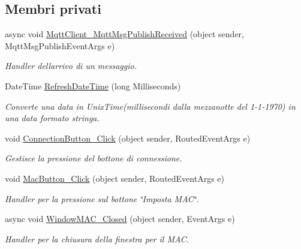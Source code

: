 \subsection*{Membri privati}
\begin{DoxyCompactItemize}
\item 
\mbox{\label{classclient__app_1_1_main_window_a6e80a62bc23dfd09f691d94461abc62f}} 
async void \mbox{\hyperlink{classclient__app_1_1_main_window_a6e80a62bc23dfd09f691d94461abc62f}{Mqtt\+Client\+\_\+\+Mqtt\+Msg\+Publish\+Received}} (object sender, Mqtt\+Msg\+Publish\+Event\+Args e)
\begin{DoxyCompactList}\small\item\em Handler dell\textquotesingle{}arrivo di un messaggio. \end{DoxyCompactList}\item 
Date\+Time \mbox{\hyperlink{classclient__app_1_1_main_window_aed5a74551edec2ad387d85b8b883597d}{Refresh\+Date\+Time}} (long Milliseconds)
\begin{DoxyCompactList}\small\item\em Converte una data in Unix\+Time(millisecondi dalla mezzanotte del 1-\/1-\/1970) in una data formato stringa. \end{DoxyCompactList}\item 
\mbox{\label{classclient__app_1_1_main_window_ab49d6cb430735fe596f1a9960dbd40b8}} 
void \mbox{\hyperlink{classclient__app_1_1_main_window_ab49d6cb430735fe596f1a9960dbd40b8}{Connection\+Button\+\_\+\+Click}} (object sender, Routed\+Event\+Args e)
\begin{DoxyCompactList}\small\item\em Gestisce la pressione del bottone di connessione. \end{DoxyCompactList}\item 
\mbox{\label{classclient__app_1_1_main_window_a8737e8fbbd32fb2664313a25652c7eb4}} 
void \mbox{\hyperlink{classclient__app_1_1_main_window_a8737e8fbbd32fb2664313a25652c7eb4}{Mac\+Button\+\_\+\+Click}} (object sender, Routed\+Event\+Args e)
\begin{DoxyCompactList}\small\item\em Handler per la pressione sul bottone \char`\"{}\+Imposta M\+A\+C\char`\"{}. \end{DoxyCompactList}\item 
\mbox{\label{classclient__app_1_1_main_window_a7d895d3e99744774886008f8f63ee927}} 
async void \mbox{\hyperlink{classclient__app_1_1_main_window_a7d895d3e99744774886008f8f63ee927}{Window\+M\+A\+C\+\_\+\+Closed}} (object sender, Event\+Args e)
\begin{DoxyCompactList}\small\item\em Handler per la chiusura della finestra per il M\+AC. \end{DoxyCompactList}\end{DoxyCompactItemize}
